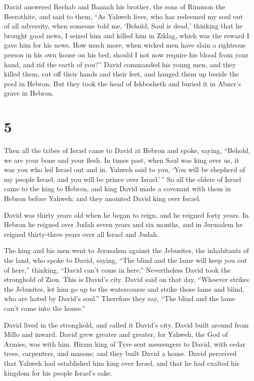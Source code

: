  David answered Rechab and Baanah his brother, the sons of
Rimmon the Beerothite, and said to them, ``As Yahweh lives, who has
redeemed my soul out of all adversity,  when someone told
me, `Behold, Saul is dead,' thinking that he brought good news, I seized
him and killed him in Ziklag, which was the reward I gave him for his
news.  How much more, when wicked men have slain a
righteous person in his own house on his bed, should I not now require
his blood from your hand, and rid the earth of you?'' 
David commanded his young men, and they killed them, cut off their hands
and their feet, and hanged them up beside the pool in Hebron. But they
took the head of Ishbosheth and buried it in Abner's grave in Hebron.

\hypertarget{section-4}{%
\section{5}\label{section-4}}

 Then all the tribes of Israel came to David at Hebron and
spoke, saying, ``Behold, we are your bone and your flesh. 
In times past, when Saul was king over us, it was you who led Israel out
and in. Yahweh said to you, `You will be shepherd of my people Israel,
and you will be prince over Israel.'\,''  So all the elders
of Israel came to the king to Hebron, and king David made a covenant
with them in Hebron before Yahweh; and they anointed David king over
Israel.

 David was thirty years old when he began to reign, and he
reigned forty years.  In Hebron he reigned over Judah seven
years and six months, and in Jerusalem he reigned thirty-three years
over all Israel and Judah.

 The king and his men went to Jerusalem against the
Jebusites, the inhabitants of the land, who spoke to David, saying,
``The blind and the lame will keep you out of here,'' thinking, ``David
can't come in here.''  Nevertheless David took the
stronghold of Zion. This is David's city.  David said on
that day, ``Whoever strikes the Jebusites, let him go up to the
watercourse and strike those lame and blind, who are hated by David's
soul.'' Therefore they say, ``The blind and the lame can't come into the
house.''

 David lived in the stronghold, and called it David's city.
David built around from Millo and inward.  David grew
greater and greater, for Yahweh, the God of Armies, was with him.
 Hiram king of Tyre sent messengers to David, with cedar
trees, carpenters, and masons; and they built David a house.
 David perceived that Yahweh had established him king over
Israel, and that he had exalted his kingdom for his people Israel's
sake.


